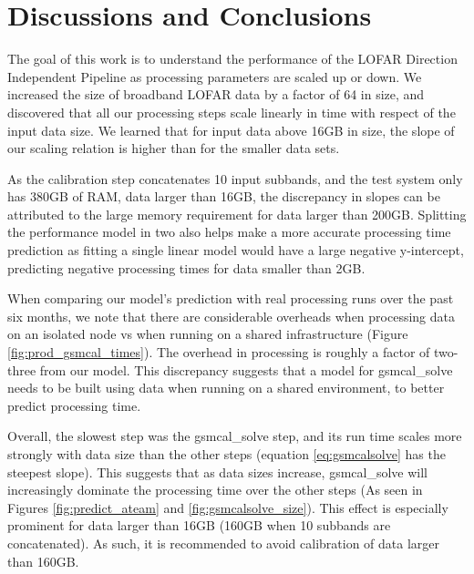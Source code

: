 \documentclass[preprint,5p]{elsarticle}
\begin{document}
\section{Discussions and Conclusions}\label{sec:discussions}

The goal of this work is to understand the performance of the LOFAR Direction Independent Pipeline as processing parameters are scaled up or down. We increased the size of broadband LOFAR data by a factor of 64 in size, and discovered that all our processing steps scale linearly in time with respect of the input data size. We learned that for input data above 16GB in size, the slope of our scaling relation is higher than for the smaller data sets.

As the calibration step concatenates 10 input subbands, and the test system only has 380GB of RAM, data larger than 16GB, the discrepancy in slopes can be attributed to the large memory requirement for data larger than 200GB. Splitting the performance model in two also helps make a more accurate processing time prediction as fitting a single linear model would have a large negative y-intercept, predicting negative processing times for data smaller than 2GB. 

When comparing our model's prediction with real processing runs over the past six months, we note that there are considerable overheads when processing data on an isolated node vs when running on a shared infrastructure (Figure \ref{fig:prod_gsmcal_times}). The overhead in processing is roughly a factor of two-three from our model. This discrepancy suggests that a model for gsmcal\_solve needs to be built using data when running on a shared environment, to better predict processing time. 

Overall, the slowest step was the gsmcal\_solve step, and its run time scales more strongly with data size than the other steps (equation \ref{eq:gsmcalsolve} has the steepest slope). This suggests that as data sizes increase, gsmcal\_solve will increasingly dominate the processing time over the other steps (As seen in Figures \ref{fig:predict_ateam} and \ref{fig:gsmcalsolve_size}). This effect is especially prominent for data larger than 16GB (160GB when 10 subbands are concatenated). As such, it is recommended to avoid calibration of data larger than 160GB. 
\end{document}
